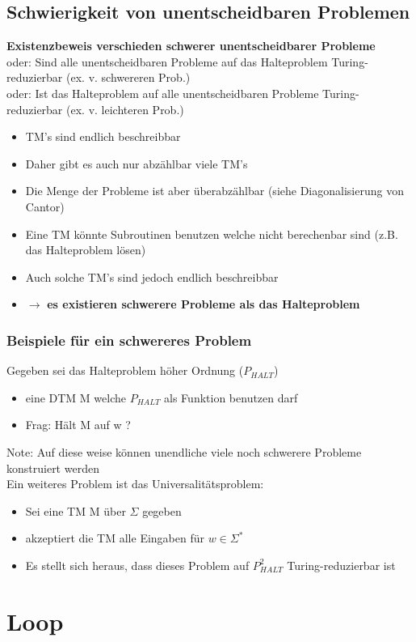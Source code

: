 \documentclass[12pt,a4paper]{article}
\begin{document}
\subsection{Schwierigkeit von unentscheidbaren Problemen}
\textbf{Existenzbeweis verschieden schwerer unentscheidbarer Probleme}\\
oder: Sind alle unentscheidbaren Probleme auf das Halteproblem Turing-reduzierbar (ex. v. schwereren Prob.)\\
oder: Ist das Halteproblem auf alle unentscheidbaren Probleme Turing-reduzierbar (ex. v. leichteren Prob.)
\begin{itemize}
\item TM's sind endlich beschreibbar
\item Daher gibt es auch nur abzählbar viele TM's
\item Die Menge der Probleme ist aber überabzählbar (siehe Diagonalisierung von Cantor)
\item Eine TM könnte Subroutinen benutzen welche nicht berechenbar sind (z.B. das Halteproblem lösen)
\item Auch solche TM's sind jedoch endlich beschreibbar
\item $\rightarrow$ \textbf{es existieren schwerere Probleme als das Halteproblem}
\end{itemize}
\subsubsection{Beispiele für ein schwereres Problem}
Gegeben sei das Halteproblem höher Ordnung ($P_{HALT}$)
\begin{itemize}
\item eine DTM M welche $P_{HALT}$ als Funktion benutzen darf
\item Frag: Hält M auf w ?
\end{itemize}
Note: Auf diese weise können unendliche viele noch schwerere Probleme konstruiert werden\\
Ein weiteres Problem ist das Universalitätsproblem:
\begin{itemize}
\item Sei eine TM M über $\Sigma$ gegeben
\item akzeptiert die TM alle Eingaben für $w \in \Sigma^*$
\item Es stellt sich heraus, dass dieses Problem auf $P_{HALT}^2$ Turing-reduzierbar ist
\end{itemize} 


\section{Loop}
\end{document}
